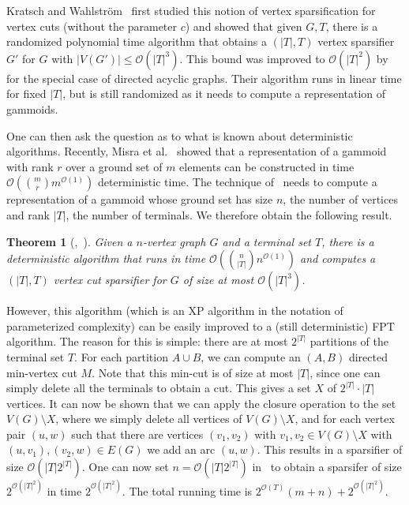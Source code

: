 \documentclass[11pt]{article}
\newtheorem{theorem}{Theorem}[section]
\newcommand{\OO}{\mathcal{O}}
\newcommand{\Wahlstrom}{Wahlstr\"{o}m\xspace}
\begin{document}
Kratsch and \Wahlstrom~\cite{kratsch2012representative,kratsch2020representative} first studied this notion of vertex sparsification for vertex cuts (without the parameter $c$) and showed that given $G,T$,  there is a randomized polynomial time algorithm that obtains a $(|T|, T)$ vertex sparsifier $G'$ for $G$ with $|V(G')| \leq \OO(|T|^3)$. This bound was improved to $\OO(|T|^2)$ by~\cite{he2021near} for the special case of directed acyclic graphs. Their algorithm runs in linear time for fixed $|T|$, but is still randomized as it needs to compute a representation of gammoids.   

One can then ask the question as to what is known about deterministic algorithms. Recently, Misra et al.~\cite{misra2020linear} showed that a representation of a gammoid with rank $r$ over a ground set of $m$ elements can be constructed in time $\OO({m \choose r} m^{\OO(1)})$ deterministic time. The technique of~\cite{kratsch2012representative} needs to compute a representation of a gammoid whose ground set has size $n$, the number of vertices and rank $|T|$, the number of terminals. We therefore obtain the following result.

\begin{theorem}[\cite{kratsch2012representative},~\cite{misra2020linear}]
Given a $n$-vertex graph $G$ and a terminal set $T$, there is a deterministic algorithm that runs in time $\OO({n \choose |T|} n^{\OO(1)})$ and computes a $(|T|, T)$ vertex cut sparsifier for $G$ of size at most $\OO(|T|^3)$.
\label{thm:detsparsifier}
\end{theorem}


However, this algorithm (which is an XP algorithm in the notation of parameterized complexity) can be easily improved to a (still deterministic) FPT algorithm. The reason for this is simple: there are at most $2^{|T|}$ partitions of the terminal set $T$. For each partition $A \cup B$, we can compute an $(A,B)$ directed min-vertex cut $M$. Note that this min-cut is of size at most $|T|$, since one can simply delete all the terminals to obtain a cut. This gives a set $X$ of $2^{|T|} \cdot |T|$ vertices. It can now be shown that we can apply the closure operation to the set $V(G) \setminus X$, where we simply delete all vertices of $V(G) \setminus X$, and for each vertex pair $(u,w)$ such that there are vertices $(v_1, v_2)$ with $v_1, v_2 \in V(G) \setminus X$ with $(u,v_1), (v_2, w) \in E(G)$ we add an arc $(u,w)$. This results in a sparsifier of size $\OO(|T|2^{|T|})$. One can now set $n = \OO(|T|2^{|T|})$ in~ to obtain a sparsifer of size $2^{\OO(|T|^2)}$ in time $2^{\OO(|T|^2)}$. The total running time is $2^{\OO(T)}(m + n) + 2^{\OO(|T|^2)}$.
\end{document}

